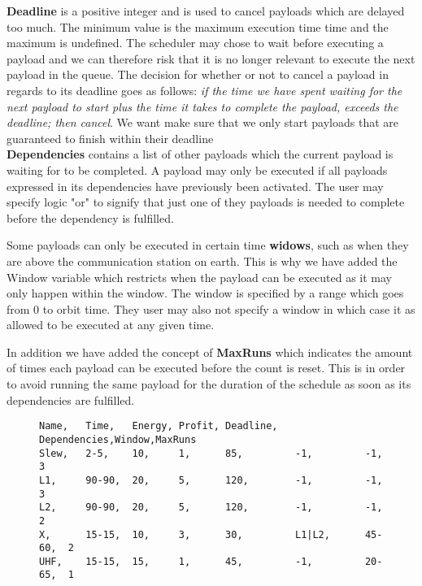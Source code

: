 \textbf{Deadline} is a positive integer and is used to cancel payloads which are delayed too much.
The minimum value is the maximum execution time time and the maximum is undefined.
The scheduler may chose to wait before executing a payload and we can therefore risk that it is no longer relevant to execute the next payload in the queue.
The decision for whether or not to cancel a payload in regards to its deadline goes as follows: \textit{if the time we have spent waiting for the next payload to start plus the time it takes to complete the payload, exceeds the deadline; then cancel}. We want make sure that we only start payloads that are guaranteed to finish within their deadline\\
\textbf{Dependencies} contains a list of other payloads which the current payload is waiting for to be completed. A payload may only be executed if all payloads expressed in its dependencies have previously been activated. The user may specify logic "or" to signify that just one of they payloads is needed to complete before the dependency is fulfilled.

Some payloads can only be executed in certain time \textbf{widows}, such as when they are above the communication station on earth.
This is why we have added the Window variable which restricts when the payload can be executed as it may only happen within the window. The window is specified by a range which goes from 0 to orbit time. They user may also not specify a window in which case it as allowed to be executed at any given time.

In addition we have added the concept of \textbf{MaxRuns} which indicates the amount of times each payload can be executed before the count is reset. This is in order to avoid running the same payload for the duration of the schedule as soon as its dependencies are fulfilled.
\begin{figure}[H]
\begin{lstlisting}[caption={An example of how five payloads can be defined}, label=lst:csv, language=text]
Name,	Time,	Energy,	Profit,	Deadline,	Dependencies,Window,MaxRuns
Slew,	2-5,	10,		1,		85,			-1,			-1,		3
L1,		90-90,	20,		5,		120,		-1,			-1,		3
L2,		90-90,	20,		5,		120,		-1,			-1,		2
X,		15-15,	10,		3,		30,			L1|L2,		45-60,	2
UHF,	15-15,	15,		1,		45,			-1,			20-65,	1
\end{lstlisting}
\end{figure}
